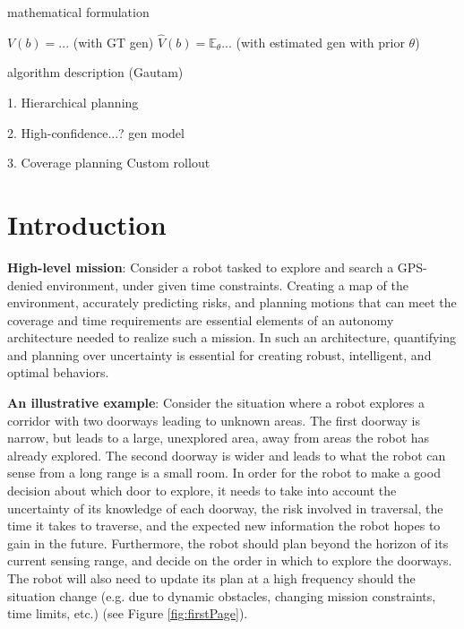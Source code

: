 \documentclass{article}
\newcommand{\ph}[1]{{\textbf{#1}:}} %
\begin{document}
mathematical formulation

$V(b) = ...$ (with GT gen)
$\hat{V}(b) = \mathbb{E}_\theta ...$ (with estimated gen with prior $\theta$)



algorithm description (Gautam)

1. Hierarchical planning



2. High-confidence...? gen model


3. Coverage planning
Custom rollout






\section{Introduction}









\ph{High-level mission} Consider a robot tasked to explore and search a GPS-denied environment, under given time constraints. Creating a map of the environment, accurately predicting risks, and planning motions that can meet the coverage and time requirements are essential elements of an autonomy architecture needed to realize such a mission.  In such an architecture, quantifying and planning over uncertainty is essential for creating robust, intelligent, and optimal behaviors.

\ph{An illustrative example} Consider the situation where a robot explores a corridor with two doorways leading to unknown areas.  The first doorway is narrow, but leads to a large, unexplored area, away from areas the robot has already explored.  The second doorway is wider and leads to what the robot can sense from a long range is a small room.  In order for the robot to make a good decision about which door to explore, it needs to take into account the uncertainty of its knowledge of each doorway, the risk involved in traversal, the time it takes to traverse, and the expected new information the robot hopes to gain in the future.  Furthermore, the robot should plan beyond the horizon of its current sensing range, and decide on the order in which to explore the doorways.  The robot will also need to update its plan at a high frequency should the situation change (e.g. due to dynamic obstacles, changing mission constraints, time limits, etc.) (see Figure \ref{fig:firstPage}).
\end{document}
